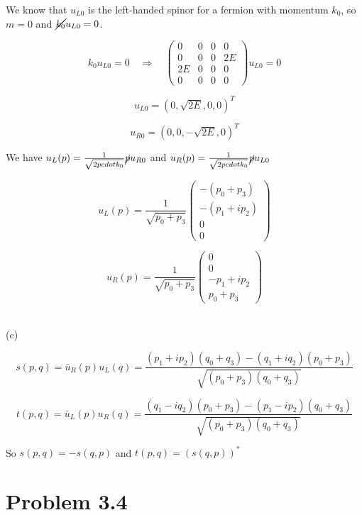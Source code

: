 \documentclass[11pt]{article} %
\begin{document}
We know that $u_{L0}$ is the left-handed spinor for a fermion with momentum $k_0$, so $m=0$ and $\cancel{k_0}u_{L0} = 0$.

\[
    k_{0} u_{L 0}=0 \quad \Rightarrow \quad\left(\begin{array}{cccc}
        0 & 0 & 0 & 0 \\
        0 & 0 & 0 & 2 E \\
        2 E & 0 & 0 & 0 \\
        0 & 0 & 0 & 0
        \end{array}\right) u_{L 0}=0    
\]

\[
    u_{L 0} = (0, \sqrt{2E}, 0, 0)^{T}
\]

\[
    u_{R 0} = (0, 0, -\sqrt{2E}, 0)^{T}
\]

We have $u_{L}(p) = \frac{1}{\sqrt{2 p cdot k_0}} \cancel{p} u_{R0}$ and $u_{R}(p) = \frac{1}{\sqrt{2 p cdot k_0}} \cancel{p} u_{L0}$

\[
    u_{L}(p) = \frac{1}{\sqrt{p_{0}+p_{3}}}\left(\begin{array}{c}
        -\left(p_{0}+p_{3}\right) \\
        -\left(p_{1}+i p_{2}\right) \\
        0 \\
        0
        \end{array}\right)
\]

\[
    u_{R}(p)=\frac{1}{\sqrt{p_{0}+p_{3}}}\left(\begin{array}{c}
        0 \\
        0 \\
        -p_{1}+i p_{2} \\
        p_{0}+p_{3}
        \end{array}\right)
\]

~\\
\noindent (c)

\[
    s(p, q)=\bar{u}_{R}(p) u_{L}(q)=\frac{\left(p_{1}+i p_{2}\right)\left(q_{0}+q_{3}\right)-\left(q_{1}+i q_{2}\right)\left(p_{0}+p_{3}\right)}{\sqrt{\left(p_{0}+p_{3}\right)\left(q_{0}+q_{3}\right)}}
\]

\[
    t(p, q)=\bar{u}_{L}(p) u_{R}(q)=\frac{\left(q_{1}-i q_{2}\right)\left(p_{0}+p_{3}\right)-\left(p_{1}-i p_{2}\right)\left(q_{0}+q_{3}\right)}{\sqrt{\left(p_{0}+p_{3}\right)\left(q_{0}+q_{3}\right)}}
\]

So $s(p, q) = -s(q, p)$ and $t(p, q) = (s(q, p))^*$


\section{Problem 3.4}
\end{document}
